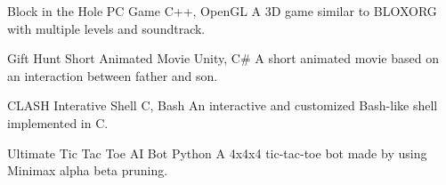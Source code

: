 


\begin{cvprojects}

    \cvproject
    {Block in the Hole} %
    {PC Game} %
    {C++, OpenGL} %
    {
        A 3D game similar to BLOXORG with multiple levels and soundtrack.
    } %

    \cvproject
    {Gift Hunt} %
    {Short Animated Movie} %
    {Unity, C\#} %
    {
        A short animated movie based on an interaction between father and son.
    } %

    \cvproject
    {CLASH} %
    {Interative Shell} %
    {C, Bash} %
    {
        An interactive and customized Bash-like shell implemented in C.
    } %

    \cvproject
    {Ultimate Tic Tac Toe} %
    {AI Bot} %
    {Python} %
    {
        A 4x4x4 tic-tac-toe bot made by using Minimax alpha beta pruning.
    } %

\end{cvprojects}


